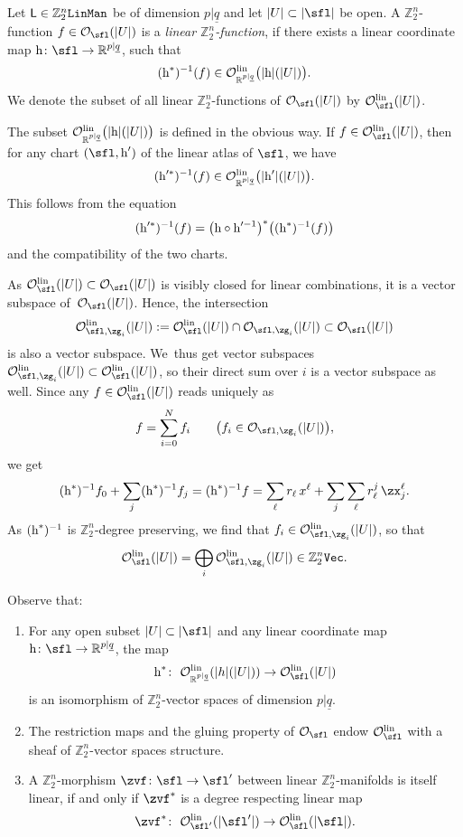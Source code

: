 \documentclass[10pt,a4paper]{amsart}
\newcommand{\rmh}{\textnormal{h}}
\newcommand{\op}[1]{\operatorname{#1}}
\newcommand{\R}{{\mathbb R}}
\newcommand{\Z}{{\mathbb Z}}
\def\ul{\underline}
\def\cO{\mathcal{O}}
\def\ul{\underline}
\newcommand{\0}{\otimes}
\newcommand{\z}{\Z_2^n}
\numberwithin{equation}{section}
\begin{document}
\begin{Definition}
Let $\textsf{L}\in\z\tt LinMan$ be of dimension $p|\ul q$ and let $|U|\subset|\sfl|$ be open. A $\z$-function $f\in\cO_\sfl(|U|)$ is a {\it linear $\z$-function}, if there exists a linear coordinate map $\rmh\colon \sfl\to \R^{p|\ul q}$, such that
\[
(\rmh^*)^{-1}(f)\in\cO^{\op{lin}}_{\R^{p|\ul q}}\big(|\rmh|(|U|)\big).
\]
We denote the subset of all linear $\z$-functions of $\cO_\sfl(|U|)$ by $\cO_\sfl^{\op{lin}}(|U|)$. \end{Definition}

The subset $\cO_{\R^{p|\ul q}}^{\op{lin}}\big(|\rmh|(|U|)\big)$ is defined in the obvious way. If $f\in\cO_\sfl^{\op{lin}}(|U|)$, then for any chart $(\sfl,\rmh')$ of the linear atlas of $\sfl$, we have
\[
(\rmh'^*)^{-1}(f)\in\cO^{\op{lin}}_{\R^{p|\ul q}}\big(|\rmh'|(|U|)\big).
\]
This follows from the equation
\[
(\rmh'^*)^{-1}(f)=\big(\rmh\circ\rmh'^{-1}\big)^*\big((\rmh^*)^{-1}(f)\big)
\]
and the compatibility of the two charts.

As $\cO_{\sfl}^{\op{lin}}(|U|)\subset\cO_{\sfl}(|U|)$ is visibly closed for linear combinations, it is a vector subspace of~$\cO_\sfl(|U|)$. Hence, the intersection
\[
\cO_{\sfl,\zg_i}^{\op{lin}}(|U|):=\cO_{\sfl}^{\op{lin}}(|U|)\cap\cO_{\sfl,\zg_i}(|U|)\subset\cO_\sfl(|U|)
\]
is also a vector subspace. We~thus get vector subspaces $\cO^{\op{lin}}_{\sfl,\zg_i}(|U|)\subset\cO^{\op{lin}}_\sfl(|U|)$, so their direct sum over $i$ is a vector subspace as well. Since any $f\in\cO^{\op{lin}}_\sfl(|U|)$ reads uniquely as
\[
f=\sum_{i=0}^Nf_i\qquad \big(f_i\in\cO_{\sfl,\zg_i}(|U|)\big),
\]
we get
\[
(\rmh^*)^{-1}f_0+\sum_j(\rmh^*)^{-1}f_j=(\rmh^*)^{-1}f=\sum_\ell r_\ell\, x^\ell+\sum_j\sum_\ell r^j_\ell\,\zx^\ell_j.
\]
As $(\rmh^*)^{-1}$ is $\z$-degree preserving, we find that $f_i\in\cO^{\op{lin}}_{\sfl,\zg_i}(|U|)$, so that
\[
\cO^{\op{lin}}_\sfl(|U|)=\bigoplus_i\cO^{\op{lin}}_{\sfl,\zg_i}(|U|)\in\z\tt Vec.
\]

\begin{Remark}\label{RemLinFct} Observe that:
\begin{enumerate}\itemsep=0pt
\item[$(i)$] For any open subset $|U|\subset|\sfl|$ and any linear coordinate map $\rmh\colon \sfl\to\R^{p|\ul q}$, the map
\[
\rmh^*\colon\ \cO^{\op{lin}}_{\R^{p|\ul q}}(|h|(|U|))\to \cO^{\op{lin}}_\sfl(|U|)
\]
is an isomorphism of $\z$-vector spaces of dimension $p|\ul q$.
\item[$(ii)$] The restriction maps and the gluing property of $\cO_\sfl$ endow $\cO^{\op{lin}}_\sfl$ with a sheaf of $\z$-vector spaces structure.
\item[$(iii)$] A $\z$-morphism $\zvf\colon \sfl\to\sfl'$ between linear $\z$-manifolds is itself linear, if and only if $\zvf^*$ is a degree respecting linear map
\[
\zvf^*\colon\ \cO^{\op{lin}}_{\sfl'}(|\sfl'|)\to\cO^{\op{lin}}_{\sfl}(|\sfl|).
\]
\end{enumerate}\end{Remark}
\end{document}
